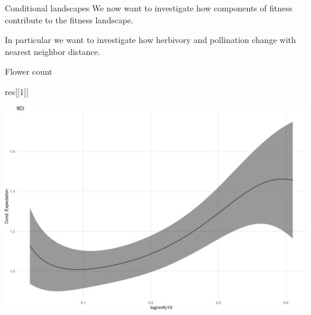 \documentclass[
  ignorenonframetext,
]{beamer}
\newenvironment{Shaded}{\begin{snugshade}}{\end{snugshade}}
\newcommand{\AttributeTok}[1]{\textcolor[rgb]{0.13,0.29,0.53}{#1}}
\newcommand{\DecValTok}[1]{\textcolor[rgb]{0.00,0.00,0.81}{#1}}
\newcommand{\FloatTok}[1]{\textcolor[rgb]{0.00,0.00,0.81}{#1}}
\newcommand{\FunctionTok}[1]{\textcolor[rgb]{0.13,0.29,0.53}{\textbf{#1}}}
\newcommand{\NormalTok}[1]{#1}
\newcommand{\OtherTok}[1]{\textcolor[rgb]{0.56,0.35,0.01}{#1}}
\newcommand{\SpecialCharTok}[1]{\textcolor[rgb]{0.81,0.36,0.00}{\textbf{#1}}}
\begin{document}
\begin{frame}[fragile]{Conditional landscapes}
\protect\hypertarget{conditional-landscapes}{}
We now want to investigate how components of fitness contribute to the
fitness landscape.

\vspace{12pt}

In particular we want to investigate how herbivory and pollination
change with nearest neighbor distance.

\vspace{12pt}
\tiny

\begin{Shaded}
\end{Shaded}
\end{frame}

\begin{frame}[fragile]{Flower count}
\protect\hypertarget{flower-count}{}
\begin{Shaded}
\begin{Highlighting}[]
\NormalTok{res[[}\DecValTok{1}\NormalTok{]]}
\end{Highlighting}
\end{Shaded}

\includegraphics{week14p2_files/figure-beamer/unnamed-chunk-54-1.pdf}
\end{frame}
\end{document}
